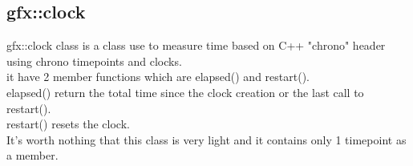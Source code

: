 \subsection{gfx::clock}
  gfx::clock class is a class use to measure time based on 
  C++ "chrono" header using chrono timepoints and clocks. \\
  it have 2 member functions which are elapsed() and restart(). \\
  elapsed() return the total time since the clock creation or the
  last call to restart(). \\
  restart() resets the clock. \\
  It's worth nothing that this class is very light and it contains only 1 timepoint as a member.

